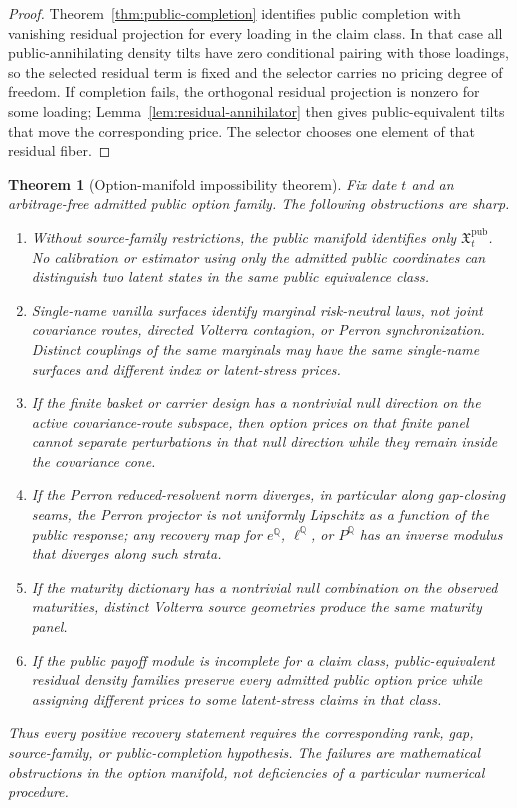 \documentclass[11pt,a4paper]{amsart}
\theoremstyle{plain}
\newtheorem{theorem}{Theorem}[section]
\theoremstyle{definition}
\theoremstyle{remark}
\newcommand{\QQ}{\mathbb{Q}}
\begin{document}
\begin{proof}
Theorem~\ref{thm:public-completion} identifies public completion with vanishing residual
projection for every loading in the claim class.  In that case all public-annihilating density
tilts have zero conditional pairing with those loadings, so the selected residual term is fixed and
the selector carries no pricing degree of freedom.  If completion fails, the orthogonal residual
projection is nonzero for some loading; Lemma~\ref{lem:residual-annihilator} then gives
public-equivalent tilts that move the corresponding price.  The selector chooses one element of
that residual fiber.
\end{proof}


\begin{theorem}[Option-manifold impossibility theorem]\label{thm:option-manifold-impossibility}
Fix date \(t\) and an arbitrage-free admitted public option family.  The following obstructions
are sharp.
\begin{enumerate}[leftmargin=2em]
\item Without source-family restrictions, the public manifold identifies only
\(\mathfrak X_t^{\mathrm{pub}}\).  No calibration or estimator using only the admitted public
coordinates can distinguish two latent states in the same public equivalence class.
\item Single-name vanilla surfaces identify marginal risk-neutral laws, not joint covariance
routes, directed Volterra contagion, or Perron synchronization.  Distinct couplings of the same
marginals may have the same single-name surfaces and different index or latent-stress prices.
\item If the finite basket or carrier design has a nontrivial null direction on the active
covariance-route subspace, then option prices on that finite panel cannot separate perturbations in
that null direction while they remain inside the covariance cone.
\item If the Perron reduced-resolvent norm diverges, in particular along gap-closing seams, the
Perron projector is not uniformly Lipschitz as a function of the public response; any recovery map
for \(e^\QQ\), \(\ell^\QQ\), or \(P^\QQ\) has an inverse modulus that diverges along such strata.
\item If the maturity dictionary has a nontrivial null combination on the observed maturities,
distinct Volterra source geometries produce the same maturity panel.
\item If the public payoff module is incomplete for a claim class, public-equivalent residual
density families preserve every admitted public option price while assigning different prices to
some latent-stress claims in that class.
\end{enumerate}
Thus every positive recovery statement requires the corresponding rank, gap,
source-family, or public-completion hypothesis.  The failures are mathematical obstructions in the
option manifold, not deficiencies of a particular numerical procedure.
\end{theorem}
\end{document}
